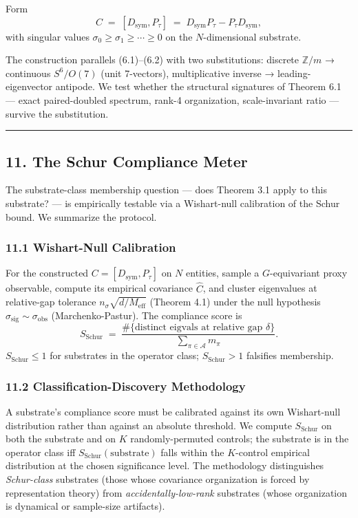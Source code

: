 \documentclass[
  11pt,
]{article}
\begin{document}
Form
\[C \;=\; [D_\text{sym}, P_\tau] \;=\; D_\text{sym} P_\tau - P_\tau D_\text{sym}, \tag{10.2}\]
with singular values \(\sigma_0 \geq \sigma_1 \geq \cdots \geq 0\) on
the \(N\)-dimensional substrate.

The construction parallels (6.1)--(6.2) with two substitutions: discrete
\(\mathbb{Z}/m\) → continuous \(S^6 / O(7)\) (unit 7-vectors),
multiplicative inverse → leading-eigenvector antipode. We test whether
the structural signatures of Theorem 6.1 --- exact paired-doubled
spectrum, rank-4 organization, scale-invariant ratio --- survive the
substitution.

\begin{center}\rule{0.5\linewidth}{0.5pt}\end{center}

\subsection{11. The Schur Compliance
Meter}\label{the-schur-compliance-meter}

The substrate-class membership question --- does Theorem 3.1 apply to
this substrate? --- is empirically testable via a Wishart-null
calibration of the Schur bound. We summarize the protocol.

\subsubsection{11.1 Wishart-Null
Calibration}\label{wishart-null-calibration}

For the constructed \(C = [D_\text{sym}, P_\tau]\) on \(N\) entities,
sample a \(G\)-equivariant proxy observable, compute its empirical
covariance \(\hat C\), and cluster eigenvalues at relative-gap tolerance
\(n_\sigma \sqrt{d/M_\text{eff}}\) (Theorem 4.1) under the null
hypothesis \(\sigma_\text{sig} \sim \sigma_\text{obs}\)
(Marchenko-Pastur). The compliance score is
\[S_\text{Schur} \;=\; \frac{\#\{\text{distinct eigvals at relative gap } \delta\}}{\sum_{\pi \in \mathcal{A}} m_\pi}. \tag{11.1}\]
\(S_\text{Schur} \leq 1\) for substrates in the operator class;
\(S_\text{Schur} > 1\) falsifies membership.

\subsubsection{11.2 Classification-Discovery
Methodology}\label{classification-discovery-methodology}

A substrate's compliance score must be calibrated against its own
Wishart-null distribution rather than against an absolute threshold. We
compute \(S_\text{Schur}\) on both the substrate and on \(K\)
randomly-permuted controls; the substrate is in the operator class iff
\(S_\text{Schur}(\text{substrate})\) falls within the \(K\)-control
empirical distribution at the chosen significance level. The methodology
distinguishes \emph{Schur-class} substrates (those whose covariance
organization is forced by representation theory) from
\emph{accidentally-low-rank} substrates (whose organization is dynamical
or sample-size artifacts).
\end{document}
